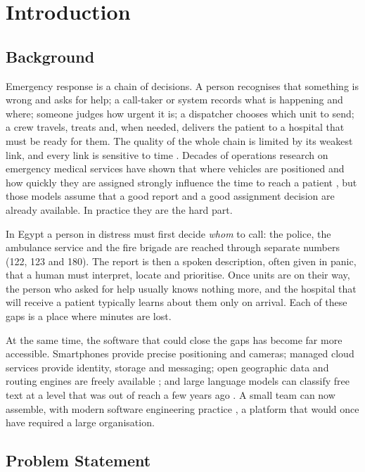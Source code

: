 \chapter{Introduction}\label{chap:introduction}

\section{Background}

Emergency response is a chain of decisions. A person recognises that something is wrong and asks for help;
a call-taker or system records what is happening and where; someone judges how urgent it is; a dispatcher
chooses which unit to send; a crew travels, treats and, when needed, delivers the patient to a hospital that
must be ready for them. The quality of the whole chain is limited by its weakest link, and every link is
sensitive to time \cite{aringhieri2017ems}. Decades of operations research on emergency medical services have
shown that where vehicles are positioned and how quickly they are assigned strongly influence the time to
reach a patient \cite{gendreau1997tabu,brotcorne2003ambulance}, but those models assume that a good report
and a good assignment decision are already available. In practice they are the hard part.

In Egypt a person in distress must first decide \emph{whom} to call: the police, the ambulance service and
the fire brigade are reached through separate numbers (122, 123 and 180). The report is then a spoken
description, often given in panic, that a human must interpret, locate and prioritise. Once units are on their
way, the person who asked for help usually knows nothing more, and the hospital that will receive a patient
typically learns about them only on arrival. Each of these gaps is a place where minutes are lost.

At the same time, the software that could close the gaps has become far more accessible. Smartphones provide
precise positioning and cameras; managed cloud services provide identity, storage and messaging; open
geographic data and routing engines are freely available \cite{haklay2008osm,luxen2011osrm}; and large language
models can classify free text at a level that was out of reach a few years ago \cite{brown2020gpt3}. A small team
can now assemble, with modern software engineering practice \cite{pressman2020se,sommerville2016software}, a
platform that would once have required a large organisation.

\section{Problem Statement}\label{sec:problem}

